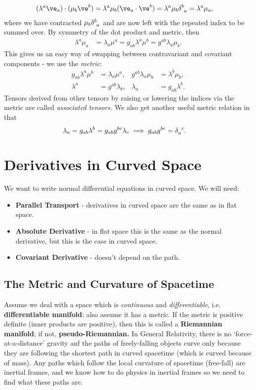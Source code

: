 \documentclass[a4paper, 11pt, normalem]{report}
\begin{document}
\begin{align}
    (\lambda^a\ve_a)\cdot(\mu_b\ve^b) &= \lambda^a\mu_b(\ve_a\cdot\ve^b) = \lambda^a\mu_b\tensor{\delta}{^b_a} = \lambda^a\mu_a,
\end{align}
where we have contracted $\mu_b\tensor{\delta}{^b_a}$ and are now left with the repeated index to be summed over.
By symmetry of the dot product and metric, then
\begin{align}
    \lambda^a\mu_a &= \lambda_a\mu^a = g_{ab}\lambda^a\mu^b = g^{ab}\lambda_a\mu_b.
\end{align}
This gives us an easy way of swapping between contravariant and covariant components - we use the \emph{metric}:
\begin{align}
    g_{ab}\lambda^a\mu^b &= \lambda_a\mu^a, & g^{ab}\lambda_a\mu_b &= \lambda^b\mu_b, \\
    \lambda^a &= g^{ab}\lambda_b, & \lambda_a &= g_{ab}\lambda^b.
\end{align}
Tensors derived from other tensors by raising or lowering the indices via the metric are called \emph{associated tensors.}
We also get another useful metric relation in that 
\begin{align}
    \lambda_a &= g_{ab}\lambda^b = g_{ab}g^{bc}\lambda_c \implies g_{ab}g^{bc} = \tensor{\delta}{_a^c}.
\end{align}

\chapter{Derivatives in Curved Space}
We want to write normal differential equations in curved space. 
We will need:
\begin{itemize}
    \item \textbf{Parallel Transport} - derivatives in curved space are  the same as in flat space.
    \item \textbf{Absolute Derivative} - in flat space this is the same as the normal derivative, but this is  the case in curved space.
    \item \textbf{Covariant Derivative} - doesn't depend on the path.
\end{itemize}

\section{The Metric and Curvature of Spacetime}
Assume we deal with a space which is \emph{continuous} and \emph{differentiable}, i.e. \textbf{differentiable manifold}; also assume it has a metric. 
If the metric is positive definite (inner products are positive), then this is called a \textbf{Riemannian manifold}; if not, \textbf{pseudo-Riemannian.}
In General Relativity, there is no `force-at-a-distance' gravity anf the paths of freely-falling objects curve only because they are following the shortest path in curved spacetime (which is curved because of mass).
Any paths which follow the local curvature of spacetime (free-fall) are inertial frames, and we know how to do physics in inertial frames so we need to find what these paths are. 
\end{document}
